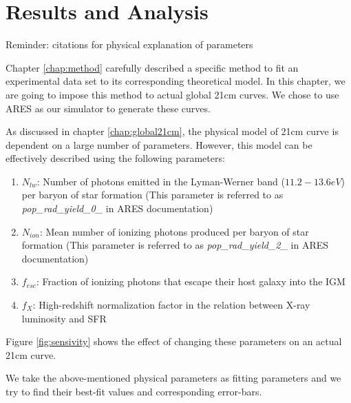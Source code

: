 \documentclass[12pt, TexShade, letterpaper]{report}
\begin{document}
\chapter{Results and Analysis}
\label{chap:results}
Reminder: citations for physical explanation of parameters\par
Chapter \ref{chap:method} carefully described a specific method to fit an experimental data set to its corresponding theoretical model. In this chapter, we are going to impose this method to actual global 21cm curves. We chose to use ARES as our simulator to generate these curves. \par
As discussed in chapter \ref{chap:global21cm}, the physical model of 21cm curve is dependent on a large number of parameters. However, this model can be effectively described using the following parameters:
\begin{enumerate}
    \item \textbf{$N_{lw}$}: Number of photons emitted in the Lyman-Werner band ($11.2-13.6eV$) per baryon of star formation (This parameter is referred to as \emph{pop\_rad\_yield\_0\_} in ARES documentation)
    \item \textbf{$N_{ion}$}: Mean number of ionizing photons produced per baryon of star formation (This parameter is referred to as \emph{pop\_rad\_yield\_2\_} in ARES documentation)
    \item \textbf{$f_{esc}$}: Fraction of ionizing photons that escape their host galaxy into the IGM
    \item \textbf{$f_X$}: High-redshift normalization factor in the relation between X-ray luminosity and SFR
\end{enumerate}
Figure \ref{fig:sensivity} shows the effect of changing these parameters on an actual 21cm curve.\par

We take the above-mentioned physical parameters as fitting parameters and we try to find their best-fit values and corresponding error-bars.\par
\end{document}
